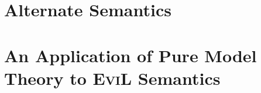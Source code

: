\documentclass[11pt]{article}
\numberwithin{equation}{subsection}
\begin{document}
\section{Alternate Semantics}
\label{alternative}


\section{An Application of Pure Model Theory to \textsc{EviL} Semantics}
\label{model-theory}


\pagebreak
{}


\end{document}

